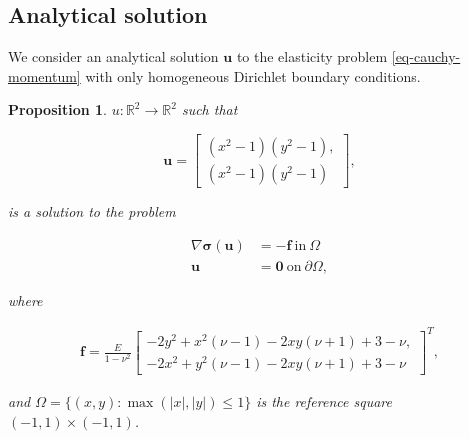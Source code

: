 \documentclass[5pt,a4paper,english]{elsarticle}%
\newtheorem{proposition}[theorem]{Proposition}
\begin{document}
\subsection{Analytical solution}


    We consider an analytical solution $\bm u$ to the elasticity problem \eqref{eq-cauchy-momentum} with only homogeneous Dirichlet boundary conditions.

\begin{proposition} \label{prop-eleastic-test-case}
    $u: \mathbb{R}^2 \rightarrow \mathbb{R}^2$ such that

    \begin{equation} \bm u =
        \begin{bmatrix}
            (x^2-1)(y^2-1), \\
            (x^2-1)(y^2-1)
        \end{bmatrix},
    \end{equation}

    is a solution to the problem

    \begin{align*}
        \nabla \bm \sigma (\bm u) &= -\bm f \ \text{in} \ \Omega \\
        \bm u &= \bm 0 \ \text{on}  \ \partial  \Omega,
    \end{align*}

    where

    \begin{align*}
        \bm f = \frac{E}{1-\nu^2}   
        \begin{bmatrix}
            -2y^2 + x^2(\nu - 1) -2xy(\nu +1) + 3 - \nu, \\
            -2x^2 + y^2(\nu - 1) -2xy(\nu +1) + 3 - \nu 
        \end{bmatrix}^T,
    \end{align*}

    and $\Omega = \{ (x,y) : \max (|x|,|y|) \leq 1 \}$ is the reference square $(-1,1) \times (-1,1)$.

\end{proposition}
\end{document}
